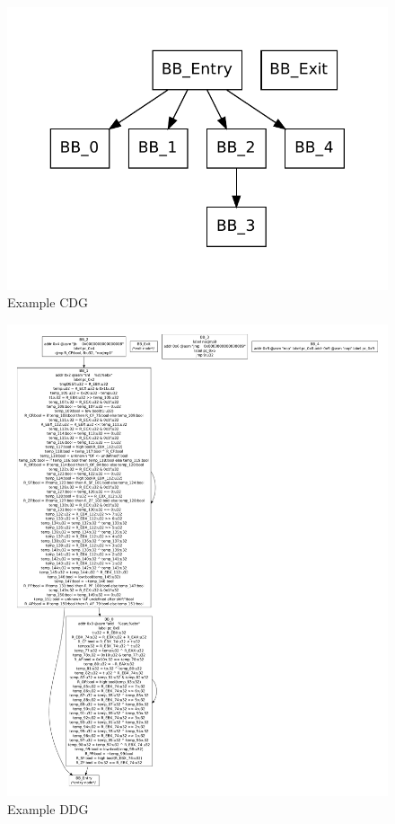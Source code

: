 \begin{figure}
  \begin{center}
    \includegraphics{chap-examples/cdg.pdf}
  \end{center}
  \caption{Example CDG}
  \label{fig:cdg}
\end{figure}

\begin{figure}
  \begin{center}
    \includegraphics[height=.9\textheight]{chap-examples/ddg.pdf}
  \end{center}
  \caption{Example DDG}
  \label{fig:ddg}
\end{figure}


